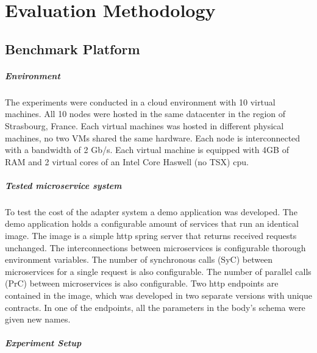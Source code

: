 
%

\chapter{Evaluation Methodology}
\label{cha:evaluation methodology}

\section{Benchmark Platform} %
\label{sec:plataform}

\paragraph{Environment}

The experiments were conducted in a cloud environment with 10 virtual machines.
All 10 nodes were hosted in the same datacenter in the region of Strasbourg, France.
Each virtual machines was hosted in different physical machines, no two VMs shared the same hardware.
Each node is interconnected with a bandwidth of 2 Gb/s.
Each virtual machine is equipped with 4GB of RAM and 2 virtual cores of an Intel Core Haswell (no TSX) cpu.

\paragraph{Tested microservice system }

To test the cost of the adapter system a demo application was developed.
The demo application holds a configurable amount of services that run an identical image.
The image is a simple http spring server that returns received requests unchanged.
The interconnections between microservices is configurable thorough environment variables.
The number of synchronous calls (SyC) between microservices for a single request is also configurable.
The number of parallel calls (PrC) between microservices is also configurable.
Two http endpoints are contained in the image, which was developed in two separate versions with unique contracts.
In one of the endpoints, all the parameters in the body's schema were given new names.

\paragraph{Experiment Setup}

